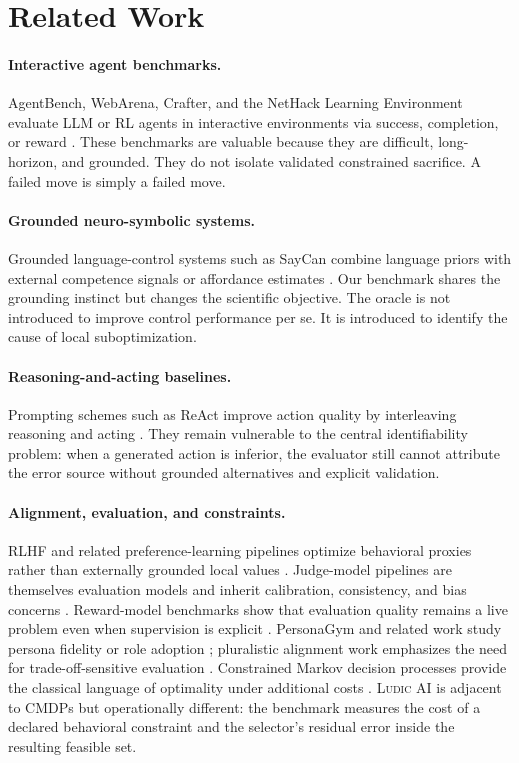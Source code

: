\documentclass[10pt]{article}
\newcommand{\ludic}{\textsc{Ludic AI}}
\begin{document}
\section{Related Work}
\paragraph{Interactive agent benchmarks.}
AgentBench, WebArena, Crafter, and the NetHack Learning Environment evaluate LLM or RL agents in interactive environments via success, completion, or reward \citep{liu2023agentbench,zhou2023webarena,hafner2021benchmarking,kuttler2020nethack}. These benchmarks are valuable because they are difficult, long-horizon, and grounded. They do not isolate validated constrained sacrifice. A failed move is simply a failed move.

\paragraph{Grounded neuro-symbolic systems.}
Grounded language-control systems such as SayCan combine language priors with external competence signals or affordance estimates \citep{ichter2023saycan}. Our benchmark shares the grounding instinct but changes the scientific objective. The oracle is not introduced to improve control performance per se. It is introduced to identify the cause of local suboptimization.

\paragraph{Reasoning-and-acting baselines.}
Prompting schemes such as ReAct improve action quality by interleaving reasoning and acting \citep{yao2023react}. They remain vulnerable to the central identifiability problem: when a generated action is inferior, the evaluator still cannot attribute the error source without grounded alternatives and explicit validation.

\paragraph{Alignment, evaluation, and constraints.}
RLHF and related preference-learning pipelines optimize behavioral proxies rather than externally grounded local values \citep{ouyang2022instructgpt}. Judge-model pipelines are themselves evaluation models and inherit calibration, consistency, and bias concerns \citep{gu2024llmjudge}. Reward-model benchmarks show that evaluation quality remains a live problem even when supervision is explicit \citep{malik2025rewardbench2}. PersonaGym and related work study persona fidelity or role adoption \citep{samuel2024personagym}; pluralistic alignment work emphasizes the need for trade-off-sensitive evaluation \citep{sorensen2024pluralistic}. Constrained Markov decision processes provide the classical language of optimality under additional costs \citep{altman1999cmdp}. \ludic{} is adjacent to CMDPs but operationally different: the benchmark measures the cost of a declared behavioral constraint and the selector's residual error inside the resulting feasible set.
\end{document}
